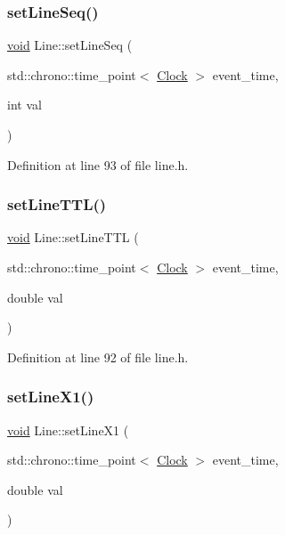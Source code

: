 \subsubsection{\texorpdfstring{set\+Line\+Seq()}{setLineSeq()}}
{\footnotesize\ttfamily \mbox{\hyperlink{glad_8h_a950fc91edb4504f62f1c577bf4727c29}{void}} Line\+::set\+Line\+Seq (\begin{DoxyParamCaption}\item[{std\+::chrono\+::time\+\_\+point$<$ \mbox{\hyperlink{universe_8h_a0ef8d951d1ca5ab3cfaf7ab4c7a6fd80}{Clock}} $>$}]{event\+\_\+time,  }\item[{int}]{val }\end{DoxyParamCaption})\hspace{0.3cm}{\ttfamily [inline]}}



Definition at line 93 of file line.\+h.

\mbox{\label{class_line_a602398c8c3131ec7236ccadbab8281d5}} 
\subsubsection{\texorpdfstring{set\+Line\+T\+T\+L()}{setLineTTL()}}
{\footnotesize\ttfamily \mbox{\hyperlink{glad_8h_a950fc91edb4504f62f1c577bf4727c29}{void}} Line\+::set\+Line\+T\+TL (\begin{DoxyParamCaption}\item[{std\+::chrono\+::time\+\_\+point$<$ \mbox{\hyperlink{universe_8h_a0ef8d951d1ca5ab3cfaf7ab4c7a6fd80}{Clock}} $>$}]{event\+\_\+time,  }\item[{double}]{val }\end{DoxyParamCaption})\hspace{0.3cm}{\ttfamily [inline]}}



Definition at line 92 of file line.\+h.

\mbox{\label{class_line_ab8df9f66bffc86994db3150a4eb8ed29}} 
\subsubsection{\texorpdfstring{set\+Line\+X1()}{setLineX1()}}
{\footnotesize\ttfamily \mbox{\hyperlink{glad_8h_a950fc91edb4504f62f1c577bf4727c29}{void}} Line\+::set\+Line\+X1 (\begin{DoxyParamCaption}\item[{std\+::chrono\+::time\+\_\+point$<$ \mbox{\hyperlink{universe_8h_a0ef8d951d1ca5ab3cfaf7ab4c7a6fd80}{Clock}} $>$}]{event\+\_\+time,  }\item[{double}]{val }\end{DoxyParamCaption})\hspace{0.3cm}{\ttfamily [inline]}}



